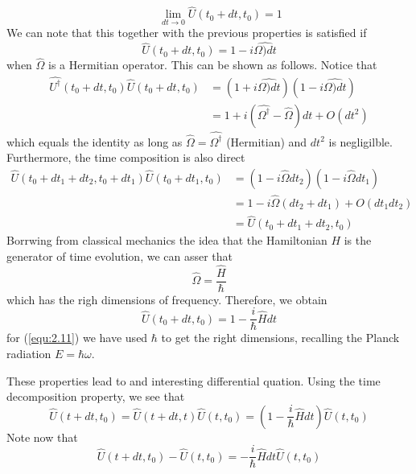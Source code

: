 \begin{itemize}
\begin{equation}
      \qquad \lim_{dt \to 0} \hat{U}(t_0+dt,t_0) = 1
      \label{equ:2.9}
    \end{equation}
    We can note that this together with the previous
    properties is satisfied if
    \begin{equation}
      \hat{U}(t_0+dt,t_0) = 1- i\hat{\Omega)dt}
      \label{equ:2.10}
    \end{equation}
    when $\hat{\Omega}$ is a Hermitian operator.
    This can be shown as follows. Notice that
    \begin{align*}
      \hat{U^\dagger} (t_0+dt,t_0) \hat{U}(t_0+dt,t_0) &= 
      (1+ i\hat{\Omega)dt})(1- i\hat{\Omega)dt})\\
      &=
      1+i(\hat{\Omega^\dagger}-\hat{\Omega})dt + O(dt^2)
    \end{align*}
    which equals the identity as long as $\hat{\Omega} =
    \hat{\Omega^\dagger}$ (Hermitian) and $dt^2$ is
    negligilble. Furthermore, the time composition is also
    direct
    \begin{align*}
      \hat{U}(t_0+dt_1+dt_2,t_0+dt_1)\hat{U}(t_0+dt_1,t_0)
      &= (1-i\hat{\Omega}dt_2)(1-i\hat{\Omega}dt_1) \\
      &= 1-i\hat{\Omega}(dt_2+dt_1) + O(dt_1dt_2)\\
      &= \hat{U}(t_0+dt_1+dt_2,t_0)
    \end{align*}
    Borrwing from classical mechanics the idea that the
    Hamiltonian $H$ is the generator of time evolution, we
    can asser that
    \begin{equation}
      \hat{\Omega} = \frac{\hat{H}}{\hbar}
      \label{equ:2.11}
    \end{equation}
    which has the righ dimensions of frequency. Therefore,
    we obtain
    \begin{equation}
      \hat{U}(t_0+dt,t_0) = 1 -\frac{i}{\hbar}\hat{H}dt
      \label{equ:2.12}
    \end{equation}
    for (\ref{equ:2.11}) we have used $\hbar$ to get the
    right dimensions, recalling the Planck radiation $E =
    \hbar \omega$.
\end{itemize}
These properties lead to and interesting differential
quation. Using the time decomposition property, we see that
\begin{equation}
  \hat{U}(t+dt,t_0) = \hat{U}(t+dt,t) \hat{U}(t,t_0) =
  (1-\frac{i}{\hbar}\hat{H}dt)\hat{U}(t,t_0)
  \label{equ:2.13}
\end{equation}
Note now that
\begin{equation}
  \hat{U}(t+dt,t_0)-\hat{U}(t,t_0) = - \frac{i}{\hbar}
  \hat{H}dt \hat{U}(t,t_0)
  \label{equ:2.14}
\end{equation}
